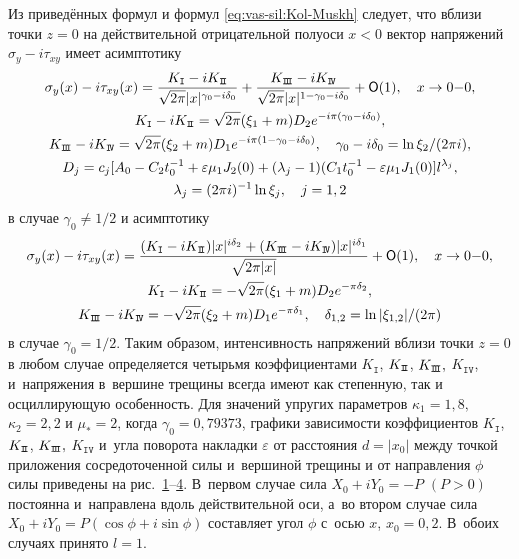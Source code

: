 Из приведённых формул и формул \eqref{eq:vas-sil:Kol-Muskh} следует, что вблизи точки  $z=0$ на действительной отрицательной полуоси $x<0$ вектор напряжений $\sigma_{y}-i\tau_{xy}$  имеет асимптотику
\begin{gather*}
\sigma_{y}(x)-i\tau_{xy}(x)=
\frac{K_{\mathtt{I}}-iK_{\mathtt{I\negmedspace I}}}{\sqrt{2\pi}|x|^{\gamma_0-i\delta_0}}+
\frac{K_{\mathtt{I\negmedspace I\negmedspace I}}-iK_{\mathtt{I\!V}}}{\sqrt{2\pi}|x|^{1-\gamma_0-i\delta_0}}+\textsf{O}(1),\quad  x\to 0{-}0,\\
K_{\mathtt{I}}-iK_{\mathtt{I\negmedspace I}}=\sqrt{2\pi}(\xi_1+m)D_2e^{-i\pi(\gamma_0-i\delta_0)},\\ 
K_{\mathtt{I\negmedspace I\negmedspace I}}-iK_{\mathtt{I\!V}}=\sqrt{2\pi}(\xi_2+m)D_1e^{-i\pi(1-\gamma_0-i\delta_0)},\quad  \gamma_0-i\delta_0={\ln\xi_2}/({2\pi i}), \\ 
D_j=c_j[A_0-C_2t_0^{-1}+\varepsilon\mu_1J_2(0)+(\lambda_j-1)(C_1t_0^{-1}-\varepsilon\mu_1J_1(0)]l^{\lambda_j},\\ \lambda_j=(2\pi i)^{-1}\ln\xi_j,\quad  j=1, 2
\end{gather*}
в случае $\gamma_0\not=1/2$ и асимптотику
\begin{gather*}
\sigma_{y}(x)-i\tau_{xy}(x)=\frac{(K_{\mathtt{I}}-iK_{\mathtt{I\negmedspace I}})|x|^{i\delta_2}+(K_{\mathtt{I\negmedspace I\negmedspace I}}-iK_{\mathtt{I\!V}})|x|^{i\delta_1}}{\sqrt{2\pi |x|}}+\textsf{O}(1),\quad  x\to 0{-}0,\\
K_{\mathtt{I}}-iK_{\mathtt{I\negmedspace I}}=-\sqrt{2\pi}(\xi_1+m)D_2e^{-\pi\delta_2},
\\
 K_{\mathtt{I\negmedspace I\negmedspace I}}-iK_{\mathtt{I\!V}}=-\sqrt{2\pi}(\xi_2+m)D_1e^{-\pi\delta_1},\quad  \delta_{1,2}={\ln|\xi_{1,2}|}/({2\pi}) 
 \end{gather*}
в случае $\gamma_0=1/2$. 
Таким образом, интенсивность напряжений вблизи точки  $z=0$ в любом случае определяется четырьмя коэффициентами  $K_{\mathtt{I}}$, $K_{\mathtt{I\negmedspace I}}$, $K_{\mathtt{I\negmedspace I\negmedspace I}},$ $ K_{\mathtt{I\!V}}$, и~напряжения в~вершине трещины всегда имеют как степенную, так и осциллирующую особенность. 
Для значений упругих параметров $\kappa_1=1,8,$ $\kappa_2=2,2$ и $\mu_*=2$, когда $\gamma_0=0,79373$, графики зависимости коэффициентов $K_{\mathtt{I}}$, $K_{\mathtt{I\negmedspace I}}$, $K_{\mathtt{I\negmedspace I\negmedspace I}},$ $ K_{\mathtt{I\!V}}$ и~угла поворота накладки $\varepsilon$ от расстояния $d=|x_0|$ между точкой приложения сосредоточенной силы и~вершиной трещины и от направления $\phi$ силы приведены на рис.~\hyperlink{vas:pict:1}{1}--\hyperlink{vas:pict:4}{4}. 
В~первом случае сила \mbox{$X_0+iY_0=-P$} $(P>0)$ постоянна и~направлена вдоль действительной оси, а~во втором случае сила $X_0+iY_0=P(\cos\phi+i\sin\phi)$ составляет угол $\phi$ с~осью  $x$, $x_0=0,2$. 
В~обоих случаях принято $l=1$.


